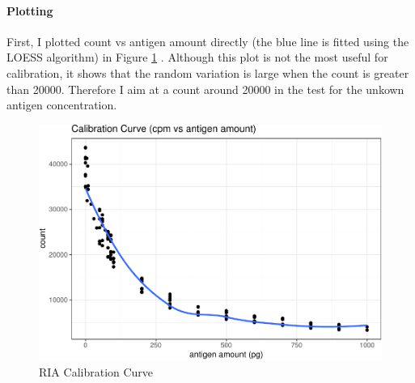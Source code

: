\documentclass[
]{article}
\newenvironment{Shaded}{\begin{snugshade}}{\end{snugshade}}
\newcommand{\DataTypeTok}[1]{\textcolor[rgb]{0.13,0.29,0.53}{#1}}
\newcommand{\FloatTok}[1]{\textcolor[rgb]{0.00,0.00,0.81}{#1}}
\newcommand{\KeywordTok}[1]{\textcolor[rgb]{0.13,0.29,0.53}{\textbf{#1}}}
\newcommand{\NormalTok}[1]{#1}
\newcommand{\OperatorTok}[1]{\textcolor[rgb]{0.81,0.36,0.00}{\textbf{#1}}}
\newcommand{\OtherTok}[1]{\textcolor[rgb]{0.56,0.35,0.01}{#1}}
\newcommand{\StringTok}[1]{\textcolor[rgb]{0.31,0.60,0.02}{#1}}
\begin{document}
\hypertarget{plotting}{%
\paragraph{Plotting}\label{plotting}}

First, I plotted count vs antigen amount directly (the blue line is fitted using the LOESS algorithm) in Figure \ref{fig:ria-cali-raw} . Although this plot is not the most useful for calibration, it shows that the random variation is large when the count is greater than 20000. Therefore I aim at a count around 20000 in the test for the unkown antigen concentration.

\begin{Shaded}
\end{Shaded}

\begin{figure}
\centering
\includegraphics{2020-03-08-immunoassay-in-silico_files/figure-latex/ria-cali-raw-1.pdf}
\caption{\label{fig:ria-cali-raw}RIA Calibration Curve}
\end{figure}
\end{document}
